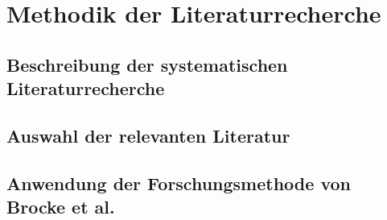 \section{Methodik der Literaturrecherche}
\subsection{ Beschreibung der systematischen Literaturrecherche}
\subsection{Auswahl der relevanten Literatur}
\subsection{Anwendung der Forschungsmethode von Brocke et al.}